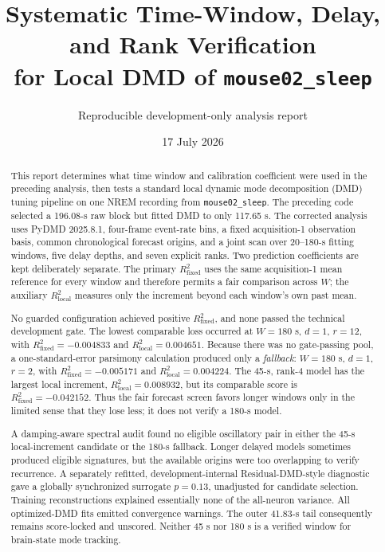 \documentclass[11pt]{article}
\title{Systematic Time-Window, Delay, and Rank Verification\\
for Local DMD of \texttt{mouse02\_sleep}}
\author{Reproducible development-only analysis report}
\date{17 July 2026}
\newcommand{\Rfixed}{R^2_{\mathrm{fixed}}}
\newcommand{\Rlocal}{R^2_{\mathrm{local}}}
\begin{document}
\maketitle

\begin{abstract}
This report determines what time window and calibration coefficient were used
in the preceding analysis, then tests a standard local dynamic mode
decomposition (DMD) tuning pipeline on one NREM recording from
\texttt{mouse02\_sleep}.  The preceding code selected a 196.08-s raw block but
fitted DMD to only 117.65 s.  The corrected analysis uses PyDMD 2025.8.1,
four-frame event-rate bins, a fixed acquisition-1 observation basis, common
chronological forecast origins, and a joint scan over 20--180-s fitting
windows, five delay depths, and seven explicit ranks.  Two prediction
coefficients are kept deliberately separate.  The primary
\(\Rfixed\) uses the same acquisition-1 mean reference for every window and
therefore permits a fair comparison across \(W\); the auxiliary \(\Rlocal\)
measures only the increment beyond each window's own past mean.

No guarded configuration achieved positive \(\Rfixed\), and none passed the
technical development gate.  The lowest comparable loss occurred at
\(W=180\) s, \(d=1\), \(r=12\), with
\(\Rfixed=-0.004833\) and \(\Rlocal=0.004651\).  Because there was no
gate-passing pool, a one-standard-error parsimony calculation produced only a
\emph{fallback}: \(W=180\) s, \(d=1\), \(r=2\), with
\(\Rfixed=-0.005171\) and \(\Rlocal=0.004224\).  The 45-s, rank-4 model has
the largest local increment, \(\Rlocal=0.008932\), but its comparable score is
\(\Rfixed=-0.042152\).  Thus the fair forecast screen favors longer windows
only in the limited sense that they lose less; it does not verify a 180-s
model.

A damping-aware spectral audit found no eligible oscillatory pair in either
the 45-s local-increment candidate or the 180-s fallback.  Longer delayed
models sometimes produced eligible signatures, but the available origins
were too overlapping to verify recurrence.  A separately refitted,
development-internal Residual-DMD-style diagnostic gave a globally
synchronized surrogate \(p=0.13\), unadjusted for candidate selection.
Training reconstructions explained essentially none of the all-neuron
variance.  All optimized-DMD fits emitted convergence warnings.  The outer
41.83-s tail consequently remains score-locked and unscored.  Neither 45 s
nor 180 s is a verified window for brain-state mode tracking.
\end{abstract}
\end{document}
